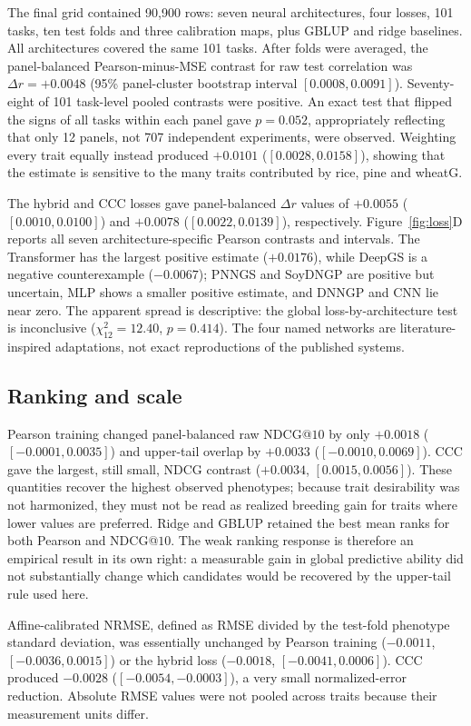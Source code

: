 The final grid contained 90,900 rows: seven neural architectures, four losses,
101 tasks, ten test folds and three calibration maps, plus GBLUP and ridge
baselines. All architectures covered the same 101 tasks. After folds were
averaged, the panel-balanced Pearson-minus-MSE contrast for raw test correlation
was $\Delta r=+0.0048$ (95\% panel-cluster bootstrap interval
$[0.0008,0.0091]$). Seventy-eight of 101 task-level pooled
contrasts were positive. An exact test that flipped the signs of all tasks
within each panel gave $p=0.052$, appropriately reflecting that only 12 panels,
not 707 independent experiments, were observed. Weighting every trait equally
instead produced $+0.0101$ ($[0.0028,0.0158]$), showing that the estimate is
sensitive to the many traits contributed by rice, pine and wheatG.

The hybrid and CCC losses gave panel-balanced $\Delta r$ values of $+0.0055$
($[0.0010,0.0100]$) and $+0.0078$ ($[0.0022,0.0139]$), respectively. Figure~\ref{fig:loss}D
reports all seven architecture-specific Pearson contrasts and intervals. The
Transformer has the largest positive estimate ($+0.0176$), while DeepGS is a
negative counterexample ($-0.0067$); PNNGS and SoyDNGP are positive but
uncertain, MLP shows a smaller positive estimate, and DNNGP and CNN lie near
zero. The apparent spread is descriptive: the global loss-by-architecture test
is inconclusive ($\chi^2_{12}=12.40$, $p=0.414$). The four named networks are
literature-inspired adaptations, not exact reproductions of the published systems.

\subsection{Ranking and scale}\label{sec:res-selection}
Pearson training changed panel-balanced raw NDCG@$10$ by only $+0.0018$
($[-0.0001,0.0035]$) and upper-tail overlap by $+0.0033$
($[-0.0010,0.0069]$). CCC gave the largest, still small, NDCG contrast
($+0.0034$, $[0.0015,0.0056]$). These quantities recover the highest observed
phenotypes; because trait desirability was not harmonized, they must not be read
as realized breeding gain for traits where lower values are preferred. Ridge
and GBLUP retained the best mean ranks for both Pearson and NDCG@$10$. The weak
ranking response is therefore an empirical result in its own right: a measurable
gain in global predictive ability did not substantially change which candidates
would be recovered by the upper-tail rule used here.

Affine-calibrated NRMSE, defined as RMSE divided by the test-fold phenotype
standard deviation, was essentially unchanged by Pearson training
($-0.0011$, $[-0.0036,0.0015]$) or the hybrid loss ($-0.0018$,
$[-0.0041,0.0006]$). CCC produced $-0.0028$ ($[-0.0054,-0.0003]$), a very small
normalized-error reduction. Absolute RMSE values were not pooled across traits
because their measurement units differ.


